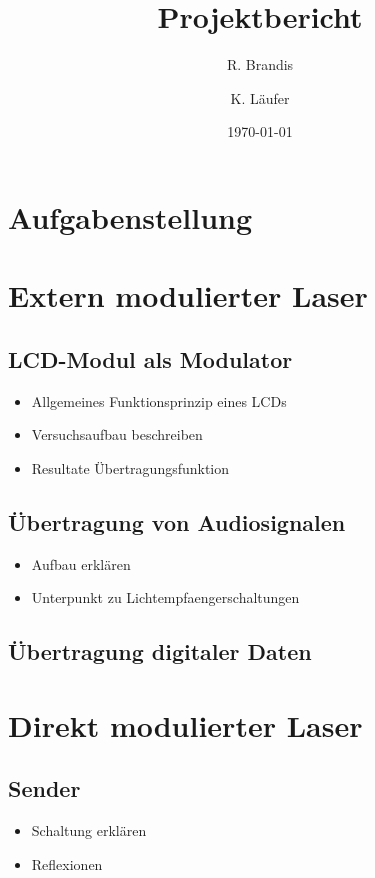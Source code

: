 \documentclass[12pt,a4paper]{article}
\title{Projektbericht}
\author{R. Brandis \and K. Läufer}
\date{\today}
\begin{document}
\maketitle
\newpage
\tableofcontents
\newpage

\section{Aufgabenstellung}

\section{Extern modulierter Laser}

\subsection{LCD-Modul als Modulator}
\begin{itemize}
\item Allgemeines Funktionsprinzip eines LCDs
\item Versuchsaufbau beschreiben
\item Resultate Übertragungsfunktion
\end{itemize}

\subsection{Übertragung von Audiosignalen}
\begin{itemize}
\item Aufbau erklären
\item Unterpunkt zu Lichtempfaengerschaltungen
\end{itemize}

\subsection{Übertragung digitaler Daten}

\section{Direkt modulierter Laser}
\subsection{Sender}
\begin{itemize}
\item Schaltung erklären
\item Reflexionen
\end{itemize}
\end{document}
